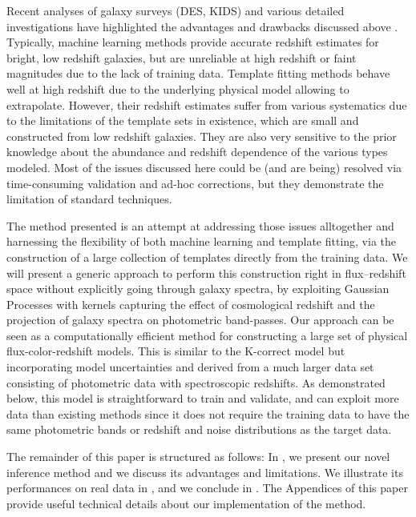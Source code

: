 \documentclass[aps,prd,showpacs,superscriptaddress,groupedaddress]{revtex4}  %
\begin{document}
Recent analyses of galaxy surveys (DES, KIDS) and various detailed \photoz investigations have highlighted the advantages and drawbacks discussed above \citep[see \eg][]{Newman:2013cac, Dahlen:2013fea, Sanchez:2014zgq, Schmidt:2014ela, Bonnett:2015pww}. 
Typically, machine learning methods \citep[\eg][]{Kind:2013eka, Collister:2003cz, Sadeh:2015lsa} provide accurate redshift estimates for bright, low redshift galaxies, but are unreliable at high redshift or faint magnitudes due to the lack of training data.
Template fitting methods \citep[\eg][]{Benitez:1998br, Brammer:2008qv, Feldmann:2006wg} behave well at high redshift due to the underlying physical model allowing to extrapolate.
However, their redshift estimates suffer from various systematics due to the limitations of the template sets in existence, which are small and constructed from low redshift galaxies.
They are also very sensitive to the prior knowledge about the abundance and redshift dependence of the various types modeled.
Most of the issues discussed here could be (and are being) resolved via time-consuming validation and ad-hoc corrections, but they demonstrate the limitation of standard \photoz techniques.

The method presented is an attempt at addressing those issues alltogether and harnessing the flexibility of both machine learning and template fitting, via the construction of a large collection of templates directly from the training data.
We will present a generic approach to perform this construction right in flux--redshift space without explicitly going through galaxy spectra, by exploiting Gaussian Processes with kernels capturing the effect of cosmological redshift and the projection of galaxy spectra on photometric band-passes.
Our approach can be seen as a computationally efficient method for constructing a large set of physical flux-color-redshift models.
This is similar to the K-correct model \citep{Blanton:2007} but incorporating model uncertainties and derived from a much larger data set consisting of photometric data with spectroscopic redshifts.
As demonstrated below, this model is straightforward to train and validate, and can exploit more data than existing methods since it does not require the training data to have the same photometric bands or redshift and noise distributions as the target data.

The remainder of this paper is structured as follows: In , we present our novel \photoz inference method and we discuss its advantages and limitations. We illustrate its performances on real data in , and we conclude in . The Appendices of this paper provide useful technical details about our implementation of the method.
\end{document}
